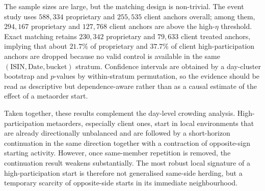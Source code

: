 The sample sizes are large, but the matching design is non-trivial. The event
study uses $588{,}334$ proprietary and $255{,}535$ client anchors overall;
among them, $294{,}167$ proprietary and $127{,}768$ client anchors are above
the high-$\eta$ threshold. Exact matching retains $230{,}342$ proprietary and
$79{,}633$ client treated anchors, implying that about $21.7\%$ of proprietary
and $37.7\%$ of client high-participation anchors are dropped because no valid
control is available in the same $(\mathrm{ISIN}, \mathrm{Date},
\mathrm{bucket})$ stratum. Confidence intervals are obtained by a day-cluster
bootstrap and $p$-values by within-stratum permutation, so the evidence should
be read as descriptive but dependence-aware rather than as a causal estimate of
the effect of a metaorder start.

Taken together, these results complement the day-level crowding analysis.
High-participation metaorders, especially client ones, start in local
environments that are already directionally unbalanced and are followed by a
short-horizon continuation in the same direction together with a contraction of
opposite-sign starting activity. However, once same-member repetition is
removed, the continuation result weakens substantially. The most robust local
signature of a high-participation start is therefore not generalised same-side
herding, but a temporary scarcity of opposite-side starts in its immediate
neighbourhood.

